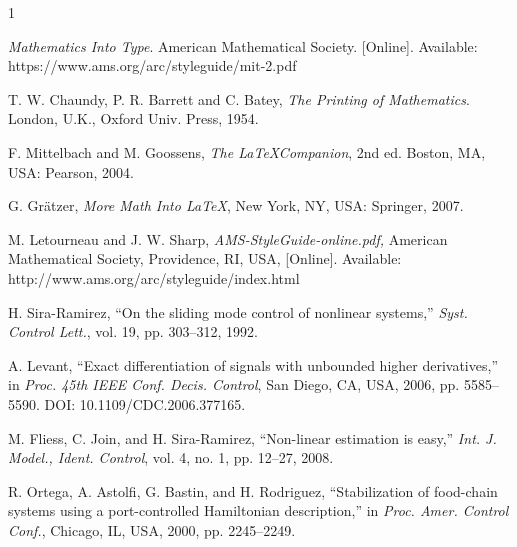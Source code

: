 \documentclass[lettersize,journal]{IEEEtran}
\begin{document}
\begin{thebibliography}{1}


{\it{Mathematics Into Type}}. American Mathematical Society. [Online]. Available: https://www.ams.org/arc/styleguide/mit-2.pdf

T. W. Chaundy, P. R. Barrett and C. Batey, {\it{The Printing of Mathematics}}. London, U.K., Oxford Univ. Press, 1954.

F. Mittelbach and M. Goossens, {\it{The \LaTeX Companion}}, 2nd ed. Boston, MA, USA: Pearson, 2004.

G. Gr\"atzer, {\it{More Math Into LaTeX}}, New York, NY, USA: Springer, 2007.

M. Letourneau and J. W. Sharp, {\it{AMS-StyleGuide-online.pdf,}} American Mathematical Society, Providence, RI, USA, [Online]. Available: http://www.ams.org/arc/styleguide/index.html

H. Sira-Ramirez, ``On the sliding mode control of nonlinear systems,'' \textit{Syst. Control Lett.}, vol. 19, pp. 303--312, 1992.

A. Levant, ``Exact differentiation of signals with unbounded higher derivatives,''  in \textit{Proc. 45th IEEE Conf. Decis.
Control}, San Diego, CA, USA, 2006, pp. 5585--5590. DOI: 10.1109/CDC.2006.377165.

M. Fliess, C. Join, and H. Sira-Ramirez, ``Non-linear estimation is easy,'' \textit{Int. J. Model., Ident. Control}, vol. 4, no. 1, pp. 12--27, 2008.

R. Ortega, A. Astolfi, G. Bastin, and H. Rodriguez, ``Stabilization of food-chain systems using a port-controlled Hamiltonian description,'' in \textit{Proc. Amer. Control Conf.}, Chicago, IL, USA,
2000, pp. 2245--2249.

\end{thebibliography}
\end{document}
